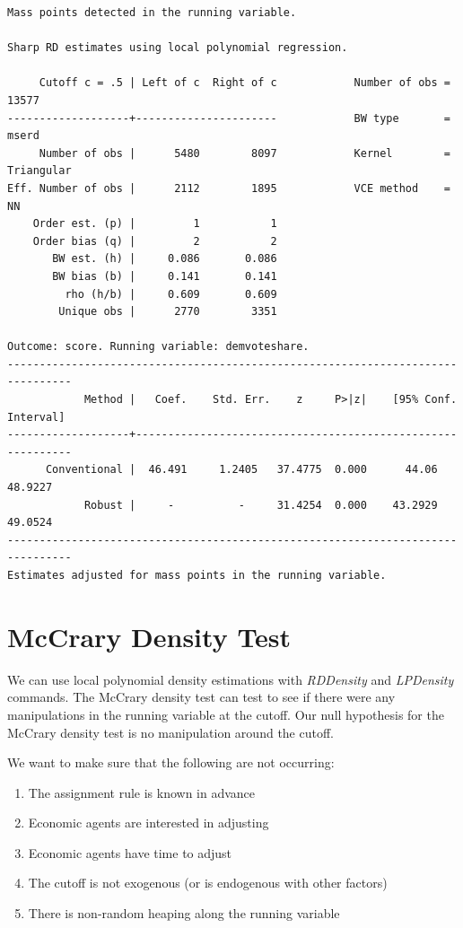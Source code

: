 \documentclass[
]{book}
\providecommand{\tightlist}{%
  \setlength{\itemsep}{0pt}\setlength{\parskip}{0pt}}
\begin{document}
\begin{verbatim}
Mass points detected in the running variable.

Sharp RD estimates using local polynomial regression.

     Cutoff c = .5 | Left of c  Right of c            Number of obs =      13577
-------------------+----------------------            BW type       =      mserd
     Number of obs |      5480        8097            Kernel        = Triangular
Eff. Number of obs |      2112        1895            VCE method    =         NN
    Order est. (p) |         1           1
    Order bias (q) |         2           2
       BW est. (h) |     0.086       0.086
       BW bias (b) |     0.141       0.141
         rho (h/b) |     0.609       0.609
        Unique obs |      2770        3351

Outcome: score. Running variable: demvoteshare.
--------------------------------------------------------------------------------
            Method |   Coef.    Std. Err.    z     P>|z|    [95% Conf. Interval]
-------------------+------------------------------------------------------------
      Conventional |  46.491     1.2405   37.4775  0.000      44.06      48.9227
            Robust |     -          -     31.4254  0.000    43.2929      49.0524
--------------------------------------------------------------------------------
Estimates adjusted for mass points in the running variable.
\end{verbatim}

\chapter{McCrary Density Test}\label{mccrary-density-test}

We can use local polynomial density estimations with \emph{RDDensity} and \emph{LPDensity} commands. The McCrary density test can test to see if there were any manipulations in the running variable at the cutoff. Our null hypothesis for the McCrary density test is no manipulation around the cutoff.

We want to make sure that the following are not occurring:

\begin{enumerate}
\def\labelenumi{\arabic{enumi}.}
\tightlist
\item
  The assignment rule is known in advance
\item
  Economic agents are interested in adjusting
\item
  Economic agents have time to adjust
\item
  The cutoff is not exogenous (or is endogenous with other factors)
\item
  There is non-random heaping along the running variable
\end{enumerate}
\end{document}
